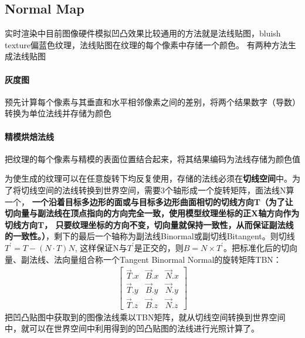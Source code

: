 \subsection{Normal Map}

实时渲染中目前图像硬件模拟凹凸效果比较通用的方法就是法线贴图，bluish texture偏蓝色纹理，法线贴图在纹理的每个像素中存储一个颜色。
有两种方法生成法线贴图
\paragraph{灰度图}
预先计算每个像素与其垂直和水平相邻像素之间的差别，将两个结果数字（导数）转换为单位法线并存储为颜色
\paragraph{精模烘焙法线}
把纹理的每个像素与精模的表面位置结合起来，将其结果编码为法线存储为颜色值

为使生成的纹理可以在任意旋转下均反复使用，存储的法线必须在\textbf{切线空间}中。为了将切线空间的法线转换到世界空间，需要3个轴形成一个旋转矩阵，面法线N算一个，
\textbf{一个沿着目标多边形的面或与目标多边形曲面相切的切线方向T（为了让切向量与副法线在顶点指向的方向完全一致，使用模型纹理坐标的正X轴方向作为切线方向T，
只要纹理坐标的方向不变，切向量就保持一致性，从而保证副法线的一致性。）}，剩下的最后一个轴称为副法线Binormal或副切线Bitangent。则切线$T^{'} = T - (N \cdot T)N $,
这样保证N与$T^{'}$是正交的，则$B=N \times T^{'}$。把标准化后的切向量、副法线、法向量组合称一个Tangent Binormal Normal的旋转矩阵TBN：
\begin{gather*}
    \begin{bmatrix}
        \overrightarrow{T}.x & \overrightarrow{B}.x & \overrightarrow{N}.x \\ 
        \overrightarrow{T}.y & \overrightarrow{B}.y & \overrightarrow{N}.y \\ 
        \overrightarrow{T}.z & \overrightarrow{B}.z & \overrightarrow{N}.z 
    \end{bmatrix}
\end{gather*}
把凹凸贴图中获取到的图像法线乘以TBN矩阵，就从切线空间转换到世界空间中，就可以在世界空间中利用得到的凹凸贴图的法线进行光照计算了。

